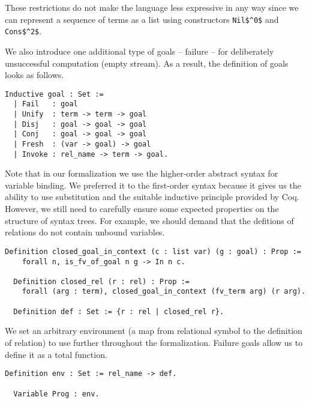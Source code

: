 These restrictions do not make the language less expressive in any way since we can represent a sequence of terms as a list using constructors \lstinline|Nil$^0$| and \lstinline|Cons$^2$|.

We also introduce one additional type of goals -- failure -- for deliberately unsuccessful computation (empty stream). As a result, the definition of goals looks as follows.

\begin{lstlisting}[language=Coq]
  Inductive goal : Set :=
  | Fail   : goal
  | Unify  : term -> term -> goal
  | Disj   : goal -> goal -> goal
  | Conj   : goal -> goal -> goal
  | Fresh  : (var -> goal) -> goal
  | Invoke : rel_name -> term -> goal.
\end{lstlisting}

Note that in our formalization we use the higher-order abstract syntax for variable binding. We preferred it to the first-order syntax because it gives us the ability to use substitution and the suitable inductive principle provided by Coq. However, we still need to carefully ensure some expected properties on the structure of syntax trees. For example, we should demand that the defitions of relations do not contain unbound variables.

\begin{lstlisting}[language=Coq]
  Definition closed_goal_in_context (c : list var) (g : goal) : Prop :=
    forall n, is_fv_of_goal n g -> In n c.

  Definition closed_rel (r : rel) : Prop :=
    forall (arg : term), closed_goal_in_context (fv_term arg) (r arg).

  Definition def : Set := {r : rel | closed_rel r}.
\end{lstlisting}

We set an arbitrary environment (a map from relational symbol to the definition of relation) to use further throughout the formalization. Failure goals allow us to define it as a total function.

\begin{lstlisting}[language=Coq]
  Definition env : Set := rel_name -> def.

  Variable Prog : env.
\end{lstlisting}
